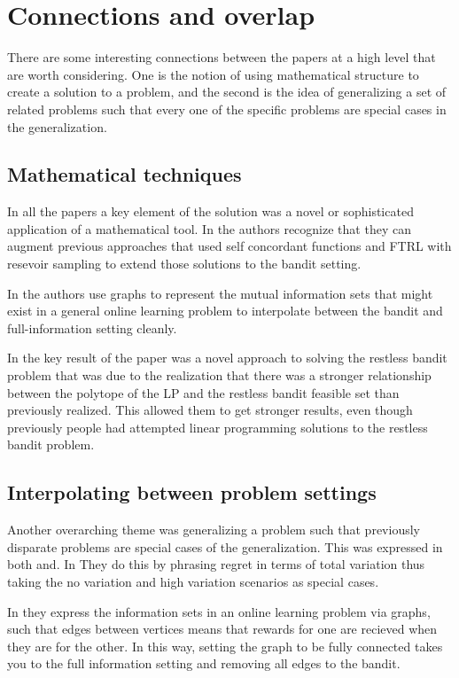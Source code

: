 \section{Connections and overlap}
There are some interesting connections between the papers at a high level that are worth considering. One is the notion of using mathematical structure to create a solution to a
problem, and the second is the idea of generalizing a set of related problems such that every one of the specific problems are special cases in the generalization.
\subsection{Mathematical techniques}
In all the papers a key element of the solution was a novel or sophisticated application of a mathematical tool. In \citep{hazan} the authors recognize that they can augment previous approaches that used self concordant functions and FTRL with resevoir sampling to extend those solutions to the bandit setting.

In \citep{alon} the authors use graphs to represent the mutual information sets that might exist in a general online learning problem to interpolate between the bandit and full-information setting cleanly.

In \citep{bertsimas} the key result of the paper was a novel approach to solving the restless bandit problem that was due to the realization that there was a stronger relationship between the polytope of the LP and the restless bandit feasible set than previously realized. This allowed them to get stronger results, even though previously people had attempted linear programming solutions to the restless bandit problem.

\subsection{Interpolating between problem settings}
Another overarching theme was generalizing a problem such that previously disparate problems are special cases of the generalization. This was expressed in both \citep{hazan} and\citep{alon}. In \citep{hazan}They do this by phrasing regret in terms of total variation thus taking the no variation and high variation scenarios as special cases. 

In \citep{alon} they express the information sets in an online learning problem via graphs, such that edges between vertices means that rewards for one are recieved when they are for the other. In this way, setting the graph to be fully connected takes you to the full information setting and removing all edges to the bandit.


